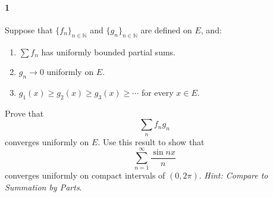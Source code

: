 \documentclass[12pt]{article}
\newenvironment{fullbox}{\begin{lrbox}{\savefullbox}\begin{minipage}{\dimexpr\textwidth-2\fboxsep\relax}}{\end{minipage}\end{lrbox}\begin{center}\framebox[\textwidth]{\usebox{\savefullbox}}\end{center}}
\newenvironment{pbox}[1][]{\begin{fullbox}\ifx#1\empty\else\paragraph{#1}\fi}{\end{fullbox}}
\theoremstyle{definition}
\newcommand{\N}{\mathbb{N}}
\begin{document}
\thispagestyle{title}


\begin{pbox}[1]
    Suppose that $\{f_n\}_{n\in\N}$ and $\{g_n\}_{n\in\N}$ are defined on $E$, and:
    \begin{enumerate}[(1)]
    \item $\sum f_n$ has uniformly bounded partial sums.
    \item $g_n \to 0$ uniformly on $E$.
    \item $g_1(x) \ge g_2(x)\ge g_3(x) \ge \cdots$ for every $x\in E$.
    \end{enumerate}
    Prove that 
    \begin{equation}
    \sum_n f_n g_n
    \end{equation}
    converges uniformly on $E$. Use this result to show that 
    \begin{equation}
    \sum_{n=1}^\infty \frac{\sin nx}{n}
    \end{equation}
    converges uniformly on compact intervals of $(0,2\pi)$.
    {\it Hint: Compare to Summation by Parts}.
\end{pbox}
\end{document}
